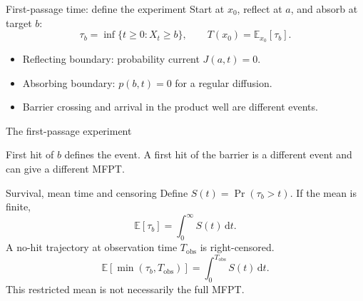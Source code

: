 \documentclass[aspectratio=169,10pt]{beamer}
\newcommand{\E}{\mathbb{E}}
\newcommand{\dd}{\mathrm{d}}
\begin{document}
\begin{frame}{First-passage time: define the experiment}
Start at $x_0$, reflect at $a$, and absorb at target $b$:
\[\tau_b=\inf\{t\geq0:X_t\geq b\},\qquad T(x_0)=\E_{x_0}[\tau_b].\]
\begin{itemize}\item Reflecting boundary: probability current $J(a,t)=0$.\item Absorbing boundary: $p(b,t)=0$ for a regular diffusion.\item Barrier crossing and arrival in the product well are different events.\end{itemize}
\end{frame}

\begin{frame}{The first-passage experiment}
\begin{center}
\end{center}
\vspace{.4cm}First hit of $b$ defines the event. A first hit of the barrier is a different event and can give a different MFPT.
\end{frame}

\begin{frame}{Survival, mean time and censoring}
Define $S(t)=\Pr(\tau_b>t)$. If the mean is finite,
\[\E[\tau_b]=\int_0^\infty S(t)\,\dd t.\]
A no-hit trajectory at observation time $T_{\mathrm{obs}}$ is right-censored.
\[\E[\min(\tau_b,T_{\mathrm{obs}})]=\int_0^{T_{\mathrm{obs}}}S(t)\,\dd t.\]
This restricted mean is not necessarily the full MFPT.
\end{frame}
\end{document}
